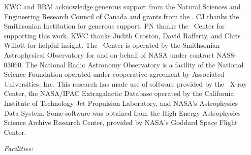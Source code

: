 \documentclass{emulateapj}
\begin{document}
\acknowledgements

KWC and BRM acknowledge generous support from the Natural Sciences and
Engineering Research Council of Canada and grants from the \cxo. CJ
thanks the Smithsonian Institution for generous support. PN thanks the
\cxo\ Center for supporting this work. KWC thanks Judith Croston,
David Rafferty, and Chris Willott for helpful insight. The
\cxo\ Center is operated by the Smithsonian Astrophysical Observatory
for and on behalf of NASA under contract NAS8-03060. The National
Radio Astronomy Observatory is a facility of the National Science
Foundation operated under cooperative agreement by Associated
Universities, Inc. This research has made use of software provided by
the \chandra\ X-ray Center, the NASA/IPAC Extragalactic Database
operated by the California Institute of Technology Jet Propulsion
Laboratory, and NASA's Astrophysics Data System. Some software was
obtained from the High Energy Astrophysics Science Archive Research
Center, provided by NASA's Goddard Space Flight Center.


{\it Facilities:}  





\clearpage



\end{document}
